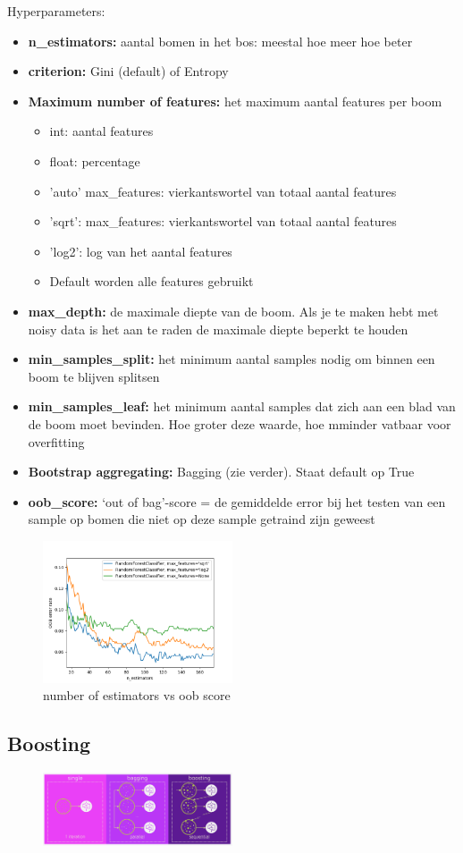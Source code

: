 \documentclass{article}
\begin{document}
Hyperparameters:

\begin{itemize}
    \item \textbf{n\_estimators:} aantal bomen in het bos: meestal hoe meer hoe beter
    \item \textbf{criterion: } Gini (default) of Entropy
    \item \textbf{Maximum number of features:} het maximum aantal features per boom
    \begin{itemize}
        \item int: aantal features
        \item float: percentage
        \item 'auto' max\_features: vierkantswortel van totaal aantal features
        \item 'sqrt': max\_features: vierkantswortel van totaal aantal features
        \item 'log2': log van het aantal features
        \item Default worden alle features gebruikt
    \end{itemize}
    \item \textbf{max\_depth:} de maximale diepte van de boom. Als je te maken hebt met noisy data is het aan te raden de maximale diepte beperkt te houden
    \item \textbf{min\_samples\_split:} het minimum aantal samples nodig om binnen een boom te blijven splitsen
    \item \textbf{min\_samples\_leaf:} het minimum aantal samples dat zich aan een blad van de boom moet bevinden. Hoe groter deze waarde, hoe mminder vatbaar voor overfitting
    \item \textbf{Bootstrap aggregating: } Bagging (zie verder). Staat default op True
    \item \textbf{oob\_score:} `out of bag'-score = de gemiddelde error bij het testen van een sample op bomen die niet op deze sample getraind zijn geweest
\end{itemize}

\begin{figure}[H]
    \centering
    \includegraphics[width=0.5\textwidth]{bagging-random-forest-trees2.png}
    \caption{number of estimators vs oob score}
\end{figure}


\subsection{Boosting}

\begin{figure}[H]
    \centering
    \includegraphics[width=0.5\textwidth]{boosting-principe.png}
    \caption{}
\end{figure}
\end{document}
